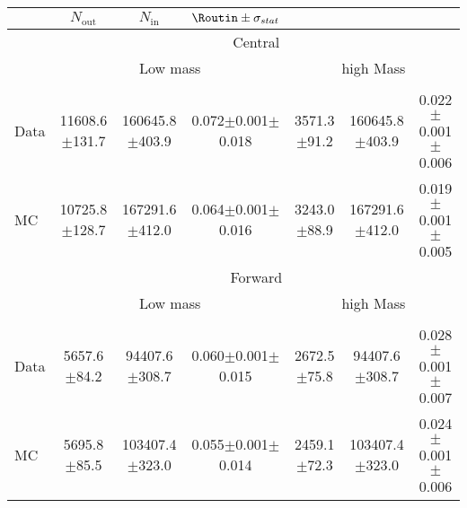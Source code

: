 
\begin{table}[hbtp]
 \renewcommand{\arraystretch}{1.3}
 \setlength{\belowcaptionskip}{6pt}
 \centering
 \caption{
     }
  \label{tab:rOutIn}
\begin{tabular}{l|c|c|cc|c|c}     
 & $N_{\text{out}}$ & $N_{\text{in}}$ & $ \Routin \pm \sigma_{stat}$  \\    
\hline
 & \multicolumn{6}{c}{Central} \\
 & \multicolumn{3}{c}{Low mass}  & \multicolumn{3}{c}{high Mass} \\ \\ 
\hline
 Data & 11608.6$\pm$131.7 & 160645.8$\pm$403.9 & 0.072$\pm$0.001$\pm$0.018 & 3571.3$\pm$91.2 & 160645.8$\pm$403.9 & 0.022$\pm$0.001$\pm$0.006 \\
 MC & 10725.8$\pm$128.7 & 167291.6$\pm$412.0 & 0.064$\pm$0.001$\pm$0.016 & 3243.0$\pm$88.9 & 167291.6$\pm$412.0 & 0.019$\pm$0.001$\pm$0.005 \\
 
 
    \hline 
& \multicolumn{6}{c}{Forward} \\
 & \multicolumn{3}{c}{Low mass}  & \multicolumn{3}{c}{high Mass} \\ \\ 
\hline
 Data & 5657.6$\pm$84.2 & 94407.6$\pm$308.7 & 0.060$\pm$0.001$\pm$0.015 & 2672.5$\pm$75.8 & 94407.6$\pm$308.7 & 0.028$\pm$0.001$\pm$0.007 \\
 MC & 5695.8$\pm$85.5 & 103407.4$\pm$323.0 & 0.055$\pm$0.001$\pm$0.014 & 2459.1$\pm$72.3 & 103407.4$\pm$323.0 & 0.024$\pm$0.001$\pm$0.006 \\


  
\end{tabular}  
\end{table}
